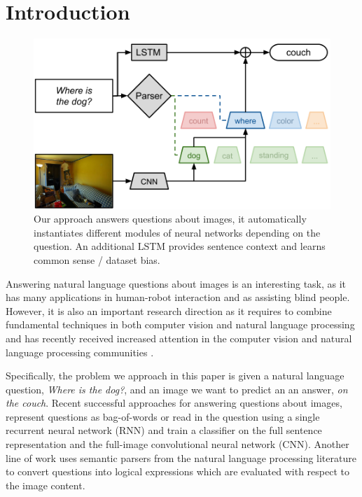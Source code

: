 \documentclass[10pt,twocolumn,letterpaper]{article}
\begin{document}
\section{Introduction}
\begin{figure}[t]
\begin{center}
\includegraphics[width=\linewidth]{fig/teaser}
\end{center}
   \caption{Our approach answers questions about images, it automatically instantiates different modules of neural networks depending on the question. An additional LSTM provides sentence context and learns common sense / dataset bias.}
\label{fig:teaser}
\end{figure}
Answering natural language questions about images is an interesting task, as it has many applications in human-robot interaction and \eg as assisting blind people. However, it is also an important research direction as it requires to combine fundamental techniques in both computer vision and natural language processing and has recently received increased attention in the computer vision and natural language processing communities \cite{malinowski15iccv}\cite{}\cite{}.

Specifically, the problem we approach in this paper is given a natural language question, \eg \emph{Where is the dog?}, and an image we want to predict an an answer, \eg \emph{on the couch}. 
Recent successful approaches for answering questions about images, represent questions as bag-of-words \cite{} or read in the question using a single recurrent neural network (RNN) \cite{malinowski15iccv}\cite{} and train a classifier on the full sentence representation and the full-image convolutional neural network (CNN). 
Another line of work  \cite{} uses semantic parsers from the natural language processing
literature to convert questions into logical expressions which are evaluated with respect to the image content.
\end{document}
